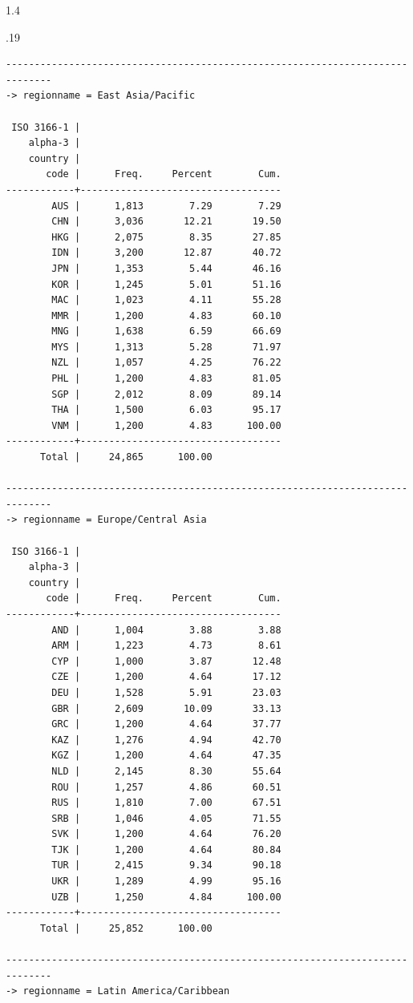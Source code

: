 \documentclass[10pt, letterpaper]{article}
\begin{document}
\begin{spacing}{1.4}
\begin{scriptsize}
\begin{spacing}{.19}
\begin{verbatim}
------------------------------------------------------------------------------
-> regionname = East Asia/Pacific

 ISO 3166-1 |
    alpha-3 |
    country |
       code |      Freq.     Percent        Cum.
------------+-----------------------------------
        AUS |      1,813        7.29        7.29
        CHN |      3,036       12.21       19.50
        HKG |      2,075        8.35       27.85
        IDN |      3,200       12.87       40.72
        JPN |      1,353        5.44       46.16
        KOR |      1,245        5.01       51.16
        MAC |      1,023        4.11       55.28
        MMR |      1,200        4.83       60.10
        MNG |      1,638        6.59       66.69
        MYS |      1,313        5.28       71.97
        NZL |      1,057        4.25       76.22
        PHL |      1,200        4.83       81.05
        SGP |      2,012        8.09       89.14
        THA |      1,500        6.03       95.17
        VNM |      1,200        4.83      100.00
------------+-----------------------------------
      Total |     24,865      100.00

------------------------------------------------------------------------------
-> regionname = Europe/Central Asia

 ISO 3166-1 |
    alpha-3 |
    country |
       code |      Freq.     Percent        Cum.
------------+-----------------------------------
        AND |      1,004        3.88        3.88
        ARM |      1,223        4.73        8.61
        CYP |      1,000        3.87       12.48
        CZE |      1,200        4.64       17.12
        DEU |      1,528        5.91       23.03
        GBR |      2,609       10.09       33.13
        GRC |      1,200        4.64       37.77
        KAZ |      1,276        4.94       42.70
        KGZ |      1,200        4.64       47.35
        NLD |      2,145        8.30       55.64
        ROU |      1,257        4.86       60.51
        RUS |      1,810        7.00       67.51
        SRB |      1,046        4.05       71.55
        SVK |      1,200        4.64       76.20
        TJK |      1,200        4.64       80.84
        TUR |      2,415        9.34       90.18
        UKR |      1,289        4.99       95.16
        UZB |      1,250        4.84      100.00
------------+-----------------------------------
      Total |     25,852      100.00

------------------------------------------------------------------------------
-> regionname = Latin America/Caribbean


\end{verbatim}
\end{spacing}
\end{scriptsize}
\end{spacing}
\end{document}
